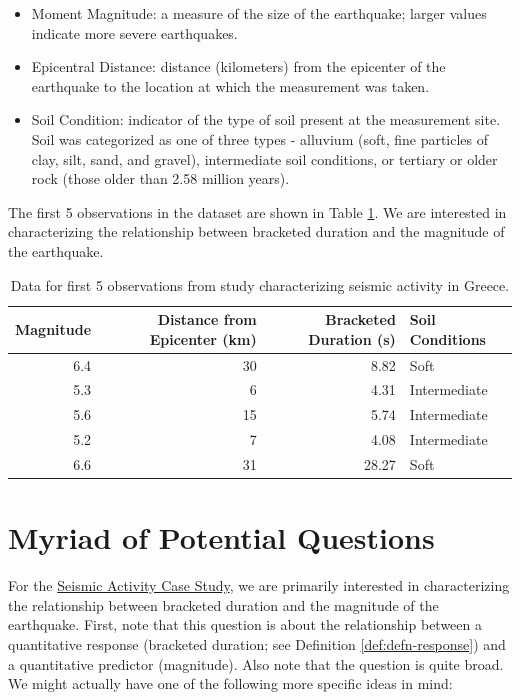 \documentclass[
]{book}
\providecommand{\tightlist}{%
  \setlength{\itemsep}{0pt}\setlength{\parskip}{0pt}}
\theoremstyle{plain}
\theoremstyle{mydefn}
\theoremstyle{myexmpl}
\theoremstyle{remark}
\begin{document}
\begin{itemize}
\tightlist
\item
  Moment Magnitude: a measure of the size of the earthquake; larger values indicate more severe earthquakes.
\item
  Epicentral Distance: distance (kilometers) from the epicenter of the earthquake to the location at which the measurement was taken.
\item
  Soil Condition: indicator of the type of soil present at the measurement site. Soil was categorized as one of three types - alluvium (soft, fine particles of clay, silt, sand, and gravel), intermediate soil conditions, or tertiary or older rock (those older than 2.58 million years).
\end{itemize}

The first 5 observations in the dataset are shown in Table \ref{tab:casegreece-table}. We are interested in characterizing the relationship between bracketed duration and the magnitude of the earthquake.

\begin{table}

\caption{\label{tab:casegreece-table}Data for first 5 observations from study characterizing seismic activity in Greece.}
\centering
\begin{tabular}[t]{r|r|r|l}
\hline
Magnitude & Distance from Epicenter (km) & Bracketed Duration (s) & Soil Conditions\\
\hline
6.4 & 30 & 8.82 & Soft\\
\hline
5.3 & 6 & 4.31 & Intermediate\\
\hline
5.6 & 15 & 5.74 & Intermediate\\
\hline
5.2 & 7 & 4.08 & Intermediate\\
\hline
6.6 & 31 & 28.27 & Soft\\
\hline
\end{tabular}
\end{table}

\hypertarget{Regquestions}{%
\chapter{Myriad of Potential Questions}\label{Regquestions}}

For the \protect\hyperlink{CaseGreece}{Seismic Activity Case Study}, we are primarily interested in characterizing the relationship between bracketed duration and the magnitude of the earthquake. First, note that this question is about the relationship between a quantitative response (bracketed duration; see Definition \ref{def:defn-response}) and a quantitative predictor (magnitude). Also note that the question is quite broad. We might actually have one of the following more specific ideas in mind:
\end{document}
